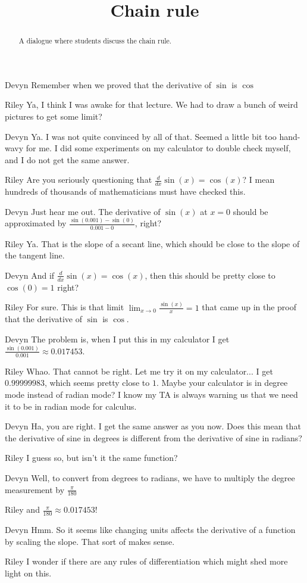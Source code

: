 \documentclass{ximera}
\title[Break-Ground:]{Chain rule}
\begin{document}
\begin{abstract}
A dialogue where students discuss the chain rule.
\end{abstract}
\maketitle

\begin{dialogue}
\item[Devyn] Remember when we proved that the derivative of $\sin$ is $\cos$
\item[Riley] Ya, I think I was awake for that lecture.  We had to draw a bunch of weird pictures to get some limit?
\item[Devyn]  Ya.  I was not quite convinced by all of that.  Seemed a little bit too hand-wavy for me.  I did some experiments on my calculator to double check myself, and I do not get the same answer.
\item[Riley] Are you seriously questioning that $\frac{d}{dx} \sin(x) = \cos(x)$?  I mean hundreds of thousands of mathematicians must have checked this. 
\item[Devyn] Just hear me out.  The derivative of $\sin(x)$ at $x =0$ should be approximated by $\frac{\sin(0.001) - \sin(0)}{ 0.001 - 0}$, right?
\item[Riley] Ya.  That is the slope of a secant line, which should be close to the slope of the tangent line.
\item[Devyn] And if $\frac{d}{dx} \sin(x) = \cos(x)$, then this should be pretty close to $\cos(0) = 1$ right?
\item[Riley] For sure.  This is that limit $\lim_{x \to 0} \frac{\sin(x)}{x} = 1$ that came up in the proof that the derivative of $\sin$ is $\cos$.
\item[Devyn] The problem is, when I put this in my calculator I get $\frac{\sin(0.001)}{0.001} \approx 0.017453$.
\item[Riley] Whao.  That cannot be right.  Let me try it on my calculator...  I get $0.99999983$, which seems pretty close to $1$.  Maybe your calculator is in degree mode instead of radian mode?  I know my TA is always warning us that we need it to be in radian mode for calculus.
\item[Devyn] Ha, you are right.  I get the same answer as you now.  Does this mean that the derivative of sine in degrees is different from the derivative of sine in radians?
\item[Riley] I guess so, but isn't it the same function?
\item[Devyn] Well, to convert from degrees to radians, we have to multiply the degree measurement by $\frac{\pi}{180}$
\item[Riley] and $\frac{\pi}{180} \approx 0.017453$!
\item[Devyn] Hmm.  So it seems like changing units affects the derivative of a function by scaling the slope.  That sort of makes sense.
\item[Riley] I wonder if there are any rules of differentiation which might shed more light on this. 
\end{dialogue}

\begin{question}

\end{question}



\end{document}
